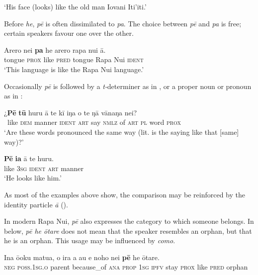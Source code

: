 \glt
‘His face (looks) like the old man Iovani Iti’iti.’ \textstyleExampleref{[R416.1180]}
\z

Before \textit{he}, \textit{pē} is often dissimilated to \textit{pa}. The choice between \textit{pē} and \textit{pa} is free; certain speakers favour one over the other.

\ea\label{ex:4.293}
\gll {\ꞌ}Arero nei \textbf{pa} he {\ꞌ}arero rapa nui {\ꞌ}ā. \\
tongue \textsc{prox} like \textsc{pred} tongue Rapa Nui \textsc{ident} \\

\glt
‘This language is like the Rapa Nui language.’\textstyleExampleref{ [R231.272]} 
\z

Occasionally \textit{pē} is followed by a \textit{t-}determiner as in , or a proper noun or pronoun as in :

\ea\label{ex:4.294}
\gll ¿\textbf{Pē} \textbf{tū} huru {\ꞌ}ā te kī iŋa o te ŋā vānaŋa nei?\\
~like \textsc{dem} manner \textsc{ident} \textsc{art} say \textsc{nmlz} of \textsc{art} \textsc{pl} word \textsc{prox}\\

\glt 
‘Are these words pronounced the same way (lit. is the saying like that [same] way)?’ \textstyleExampleref{[R615.231]} 
\z

\ea\label{ex:4.295}
\gll \textbf{Pē} \textbf{ia} {\ꞌ}ā te huru. \\
like \textsc{3sg} \textsc{ident} \textsc{art} manner  \\

\glt
‘He looks like him.’ \textstyleExampleref{[R415.886]} 
\z

As most of the examples above show, the comparison may be reinforced by the identity particle \textit{{\ꞌ}ā} ().

In modern Rapa Nui, \textit{pē} also expresses the category to which someone belongs. In  below, \textit{pē he {\ꞌ}ōtare} does not mean that the speaker resembles an orphan, but that he is an orphan. This usage may be influenced by  \textit{como}.

\ea\label{ex:4.296}
\gll {\ꞌ}Ina ō{\ꞌ}oku matu{\ꞌ}a, {\ꞌ}o ira a au e noho nei \textbf{pē} he {\ꞌ}ōtare. \\
\textsc{neg} \textsc{poss.1sg.o} parent because\_of \textsc{ana} \textsc{prop} \textsc{1sg} \textsc{ipfv} stay \textsc{prox} like \textsc{pred} orphan \\

